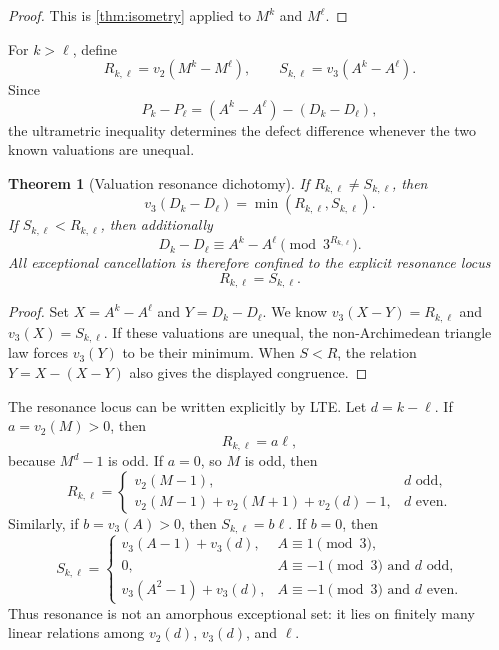 \documentclass[11pt]{article}
\newtheorem{theorem}{Theorem}[section]
\theoremstyle{definition}
\theoremstyle{remark}
\newcommand{\vTwo}{v_2}
\newcommand{\vThree}{v_3}
\begin{document}
\begin{proof}
This is \cref{thm:isometry} applied to $M^k$ and $M^\ell$.
\end{proof}

For $k>\ell$, define
\[
 R_{k,\ell}=\vTwo(M^k-M^\ell),
 \qquad
 S_{k,\ell}=\vThree(A^k-A^\ell).
\]
Since
\[
 P_k-P_\ell=(A^k-A^\ell)-(D_k-D_\ell),
\]
the ultrametric inequality determines the defect difference whenever the two
known valuations are unequal.

\begin{theorem}[Valuation resonance dichotomy]\label{thm:resonance}
If $R_{k,\ell}\ne S_{k,\ell}$, then
\begin{equation}\label{eq:defect-difference-valuation}
 \boxed{
 \vThree(D_k-D_\ell)=\min(R_{k,\ell},S_{k,\ell}).}
\end{equation}
If $S_{k,\ell}<R_{k,\ell}$, then additionally
\[
 D_k-D_\ell\equiv A^k-A^\ell\pmod{3^{R_{k,\ell}}}.
\]
All exceptional cancellation is therefore confined to the explicit resonance
locus
\[
  R_{k,\ell}=S_{k,\ell}.
\]
\end{theorem}

\begin{proof}
Set $X=A^k-A^\ell$ and $Y=D_k-D_\ell$.  We know
$\vThree(X-Y)=R_{k,\ell}$ and $\vThree(X)=S_{k,\ell}$.  If these valuations
are unequal, the non-Archimedean triangle law forces
$\vThree(Y)$ to be their minimum.  When $S<R$, the relation
$Y=X-(X-Y)$ also gives the displayed congruence.
\end{proof}

The resonance locus can be written explicitly by LTE.  Let $d=k-\ell$.
If $a=\vTwo(M)>0$, then
\[
  R_{k,\ell}=a\ell,
\]
because $M^d-1$ is odd.  If $a=0$, so $M$ is odd, then
\[
 R_{k,\ell}=
 \begin{cases}
  \vTwo(M-1),&d\text{ odd},\\
  \vTwo(M-1)+\vTwo(M+1)+\vTwo(d)-1,&d\text{ even}.
 \end{cases}
\]
Similarly, if $b=\vThree(A)>0$, then $S_{k,\ell}=b\ell$.  If $b=0$, then
\[
 S_{k,\ell}=
 \begin{cases}
  \vThree(A-1)+\vThree(d),&A\equiv1\pmod3,\\
  0,&A\equiv-1\pmod3\text{ and }d\text{ odd},\\
  \vThree(A^2-1)+\vThree(d),&A\equiv-1\pmod3\text{ and }d\text{ even}.
 \end{cases}
\]
Thus resonance is not an amorphous exceptional set: it lies on finitely many
linear relations among $\vTwo(d)$, $\vThree(d)$, and $\ell$.
\end{document}
